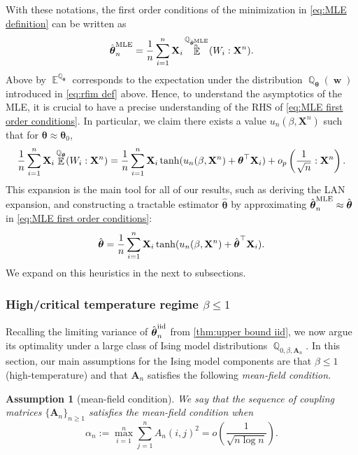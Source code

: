 \documentclass[preprint,reqno]{imsart}
\newtheorem{assume}{Assumption}[section]
\newcommand{\ttheta}{\boldsymbol{\theta}}
\DeclareMathOperator{\bw}{\textbf{w}}
\DeclareMathOperator{\EE}{\mathbb{E}}
\DeclareMathOperator{\QQ}{\mathbb{Q}}
\newcommand{\A}{\mathbf{A}}
\newcommand{\X}{\mathbf{X}}
\DeclareMathOperator{\sumin}{\sum_{\mathnormal i=1}^{\mathnormal n}}
\newcommand{\thetaiid}{\hat{\boldsymbol \theta}^{\text{iid}}_{\mathnormal n}}
\newcommand{\thetamle}{\hat{\boldsymbol \theta}^{\text{MLE}}_{\mathnormal n}}
\begin{document}
With these notations, %
the first order conditions of the minimization in \eqref{eq:MLE definition} can be written as
\begin{equation}\label{eq:MLE first order conditions}
    \thetamle = \frac{1}{n} \sumin \X_i \EE^{\QQ_{\thetamle}} (W_i : \X^n).
\end{equation}
Above by $\EE^{\QQ_{\ttheta}}$ corresponds to the expectation under the distribution $\QQ_{\ttheta} (\bw)$ introduced in \eqref{eq:rfim def} above.   Hence, to understand the asymptotics of the MLE, it is crucial to have a precise understanding of the RHS of \eqref{eq:MLE first order conditions}. In particular, we claim there exists a value $u_n(\beta, \X^n)$ such that for $\ttheta\approx \ttheta_0$,
\begin{equation}\label{eq:sum xi wi expansion intro}
    \frac{1}{n} \sumin \X_i \EE^{\QQ_{\ttheta}} (W_i : \X^n) = \frac{1}{n} \sumin \X_i \tanh(u_n(\beta, \X^n) + \ttheta^\top \X_i) + o_p \left(\frac{1}{\sqrt{n}} : \X^n \right).
\end{equation}
%
This expansion is the main tool for all of our results, such as deriving the LAN expansion, and constructing a tractable estimator $\hat{\ttheta}$ by approximating $\thetamle \approx \hat{\ttheta}$ in \eqref{eq:MLE first order conditions}:
$$\hat{\ttheta} = \frac{1}{n} \sumin \X_i \tanh(u_n(\beta, \X^n) + \hat{\ttheta}^\top \X_i).$$
We expand on this heuristics in the next to subsections. 

\subsubsection{High/critical temperature regime $\beta \le 1$}\label{subsec:high temperature cw}
Recalling the limiting variance of $\thetaiid$ from \cref{thm:upper bound iid}, we now argue its optimality under a large class of Ising model distributions $\QQ_{0, \beta, \A_n}$.
In this section, our main assumptions for the Ising model components are that $\beta \le 1$ (high-temperature) and that $\A_n$ satisfies the following \emph{mean-field condition}.
%
%
%
%
\begin{assume}[mean-field condition]\label{defi:mean-field}
    We say that the sequence of coupling matrices $\{\A_n\}_{n \ge 1}$ satisfies the mean-field condition when 
    \begin{equation}\label{eq:mean field assumption}
    \alpha_n := \max_{i=1}^n \sum_{j=1}^n A_n(i,j)^2 =o \left( \frac{1}{\sqrt{n \log n}} \right).
    \end{equation}
\end{assume}
\end{document}
